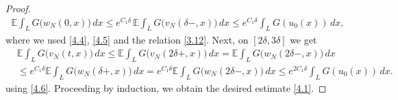 \documentclass[a4paper,12pt]{article}
\numberwithin{equation}{section}
\begin{document}
\begin{proof}
\begin{align}
\mathbb{E}\int_{L} G\bigl(w_N(0,x)\bigr)\,dx \le
e^{C_1\delta}\,
\mathbb{E}\int_{L} G\bigl(v_N(\delta-,x)\bigr)\,dx
\le
e^{C_1\delta}\int_{L} G(u_0(x))\,dx,
\label{4.6}
\end{align}
where we used \eqref{4.4}, \eqref{4.5} and the relation
\eqref{3.12}. Next, on $[2\delta,3\delta]$ we get
\begin{align*}
& \mathbb{E}\int_{L} G\bigl(v_N(t,x)\bigr)\,dx
\le
\mathbb{E}\int_{L} G\bigl(v_N(2\delta+,x)\bigr)\,dx
=
\mathbb{E}\int_{L} G\bigl(w_N(2\delta-,x)\bigr)\,dx
\nonumber\\
&\le
e^{C_1\delta}
\mathbb{E}\int_{L} G\bigl(w_N(\delta+,x)\bigr)\,dx = e^{C_1\delta}
\mathbb{E}\int_{L} G\bigl(w_N(2\delta-,x)\bigr)\,dx
\leq 
e^{2C_1\delta}
\int_{L} G(u_0(x))\,dx.
\end{align*}
using \eqref{4.6}. Proceeding by induction, we obtain the desired estimate \eqref{4.1}.
\end{proof}
\end{document}
